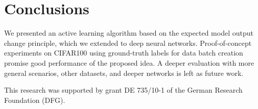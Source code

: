 \documentclass{article}
\begin{document}
\section{Conclusions}
We presented an active learning algorithm based on the expected model output change principle,
which we extended to deep neural networks.
Proof-of-concept experiments on CIFAR100 using ground-truth labels for data batch creation promise good performance of the proposed idea.
A deeper evaluation with more general scenarios, other datasets, and deeper networks is left as future work.

{
    \scriptsize
    This research was supported by grant DE 735/10-1 of the German Research Foundation (DFG).
}

%


\end{document}
